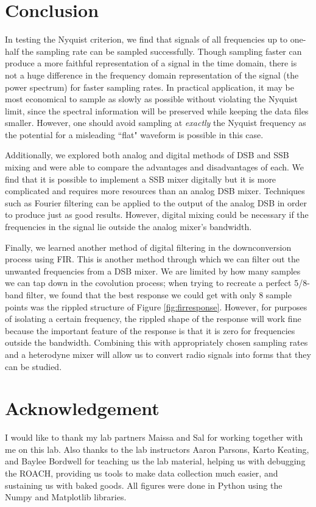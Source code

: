 \documentclass[12pt]{article}
\begin{document}
\section{Conclusion}

In testing the Nyquist criterion, we find that signals of all frequencies up to one-half the sampling rate can be sampled successfully. Though sampling faster can produce a more faithful representation of a signal in the time domain, there is not a huge difference in the frequency domain representation of the signal (the power spectrum) for faster sampling rates. In practical application, it may be most economical to sample as slowly as possible without violating the Nyquist limit, since the spectral information will be preserved while keeping the data files smaller. However, one should avoid sampling at \textit{exactly} the Nyquist frequency as the potential for a misleading ``flat" waveform is possible in this case.

Additionally, we explored both analog and digital methods of DSB and SSB mixing and were able to compare the advantages and disadvantages of each. We find that it is possible to implement a SSB mixer digitally but it is more complicated and requires more resources than an analog DSB mixer. Techniques such as Fourier filtering can be applied to the output of the analog DSB in order to produce just as good results. However, digital mixing could be necessary if the frequencies in the signal lie outside the analog mixer's bandwidth. 

Finally, we learned another method of digital filtering in the downconversion process using FIR. This is another method through which we can filter out the unwanted frequencies from a DSB mixer. We are limited by how many samples we can tap down in the covolution process; when trying to recreate a perfect 5/8-band filter, we found that the best response we could get with only 8 sample points was the rippled structure of Figure \ref{fig:firresponse}. However, for purposes of isolating a certain frequency, the rippled shape of the response will work fine because the important feature of the response is that it is zero for frequencies outside the bandwidth. Combining this with appropriately chosen sampling rates and a heterodyne mixer will allow us to convert radio signals into forms that they can be studied.

\section{Acknowledgement}
I would like to thank my lab partners Maissa and Sal for working together with me on this lab. Also thanks to the lab instructors Aaron Parsons, Karto Keating, and Baylee Bordwell for teaching us the lab material, helping us with debugging the ROACH, providing us tools to make data collection much easier, and sustaining us with baked goods.
All figures were done in Python using the Numpy and Matplotlib libraries.
\end{document}
